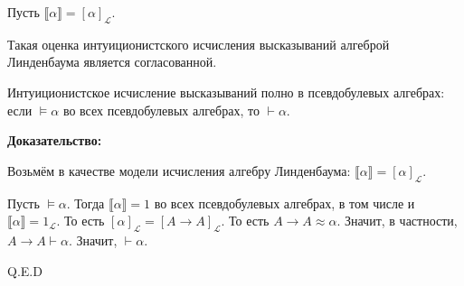 
Пусть $\llbracket\alpha\rrbracket = [\alpha]_\mathcal{L}$.

Такая оценка интуиционистского исчисления высказываний алгеброй Линденбаума является согласованной.



Интуиционистское исчисление высказываний полно в псевдобулевых алгебрах:
если $\models\alpha$ во всех псевдобулевых алгебрах, то $\vdash\alpha$. 

\textbf{Доказательство:}

Возьмём в качестве модели исчисления алгебру Линденбаума: 
$\llbracket \alpha \rrbracket = [\alpha]_\mathcal{L}$. 

Пусть $\models\alpha$. Тогда $\llbracket\alpha\rrbracket = 1$ во всех псевдобулевых алгебрах, в том числе
и $\llbracket\alpha\rrbracket = 1_\mathcal{L}$. То есть $[\alpha]_\mathcal{L} = [A\rightarrow A]_\mathcal{L}$.
То есть $A \rightarrow A \approx \alpha$. Значит, в частности, $A \rightarrow A \vdash \alpha$. 
Значит, $\vdash\alpha$.

\hfill Q.E.D

